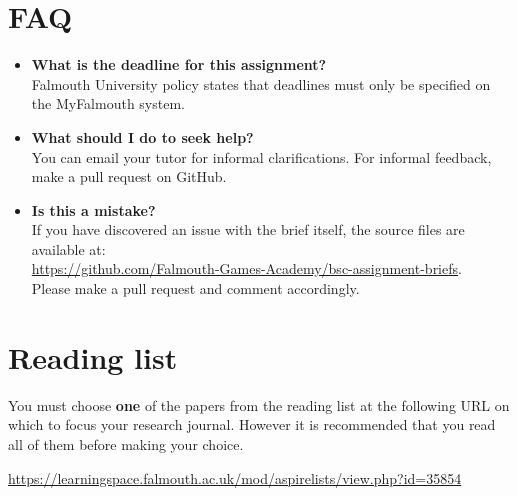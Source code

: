 \documentclass{../../fal_assignment}
\begin{document}
\section*{FAQ}

\begin{itemize}
	\item 	\textbf{What is the deadline for this assignment?} \\ 
    		Falmouth University policy states that deadlines must only be specified on the MyFalmouth system.
    		
	\item 	\textbf{What should I do to seek help?} \\ 
    		You can email your tutor for informal clarifications. For informal feedback, make a pull request on GitHub. 
    		
    	\item 	\textbf{Is this a mistake?} \\ 	
    		If you have discovered an issue with the brief itself, the source files are available at: \\
    		\url{https://github.com/Falmouth-Games-Academy/bsc-assignment-briefs}.\\
    		 Please make a pull request and comment accordingly.
\end{itemize}

\section*{Reading list}

You must choose \textbf{one} of the papers from the reading list at the following URL on which to focus your research journal.
However it is recommended that you read all of them before making your choice.

\begin{center}
    \url{https://learningspace.falmouth.ac.uk/mod/aspirelists/view.php?id=35854}
\end{center}

%
\end{document}
